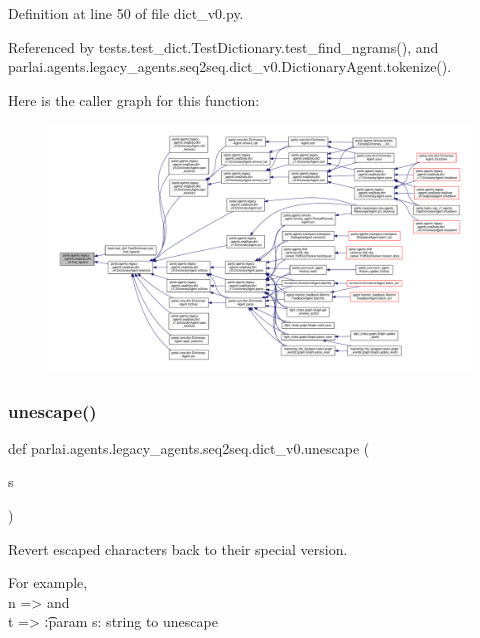 Definition at line 50 of file dict\+\_\+v0.\+py.



Referenced by tests.\+test\+\_\+dict.\+Test\+Dictionary.\+test\+\_\+find\+\_\+ngrams(), and parlai.\+agents.\+legacy\+\_\+agents.\+seq2seq.\+dict\+\_\+v0.\+Dictionary\+Agent.\+tokenize().

Here is the caller graph for this function\+:
\nopagebreak
\begin{figure}[H]
\begin{center}
\leavevmode
\includegraphics[width=350pt]{namespaceparlai_1_1agents_1_1legacy__agents_1_1seq2seq_1_1dict__v0_aa7398720bbf0f8e82c5b1495313f4f8b_icgraph}
\end{center}
\end{figure}
\mbox{\label{namespaceparlai_1_1agents_1_1legacy__agents_1_1seq2seq_1_1dict__v0_a1803c89a6cc7d5323a31a1f7e79728ed}} 
\subsubsection{\texorpdfstring{unescape()}{unescape()}}
{\footnotesize\ttfamily def parlai.\+agents.\+legacy\+\_\+agents.\+seq2seq.\+dict\+\_\+v0.\+unescape (\begin{DoxyParamCaption}\item[{}]{s }\end{DoxyParamCaption})}

\begin{DoxyVerb}Revert escaped characters back to their special version.

For example, \\n => \n and \\t => \t

:param s: string to unescape
\end{DoxyVerb}
 

